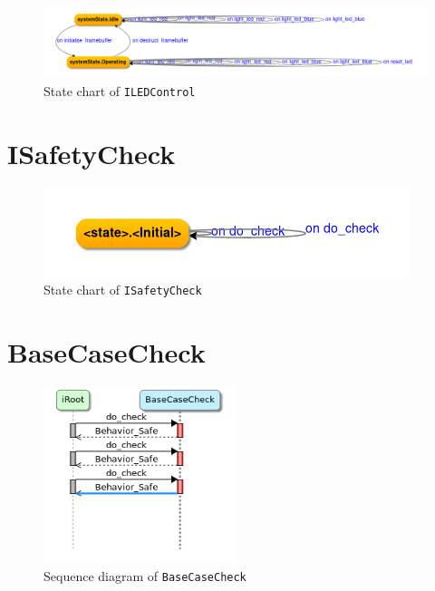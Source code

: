 \documentclass[12pt]{scrreprt}
\begin{document}
\begin{appendices}
\begin{figure}[H]
    \centering
    \includegraphics[width=\textwidth]{Figures/results/modelling_figures/ILEDControl/ILEDControlStateChart.png}
    \caption{State chart of \texttt{ILEDControl}}
    \label{fig:ILEDControl_state_chart}
\end{figure}

\section{ISafetyCheck}

\begin{figure}[H]
    \centering
    \includegraphics[width=\textwidth]{Figures/results/modelling_figures/ISafetyCheck/ISafetyCheck_state_chart.png}
    \caption{State chart of \texttt{ISafetyCheck}}
    \label{fig:ISafetyCheck_state_chart}
\end{figure}

\section{BaseCaseCheck}
\label{BaseCaseCheck_app}

\begin{figure}[H]
    \centering
    \includegraphics[width=0.5\textwidth]{Figures/results/modelling_figures/BaseCaseCheck/BaseCaseCheck_seq.png}
    \caption{Sequence diagram of \texttt{BaseCaseCheck}}
    \label{fig:BaseCaseCheck_seq}
\end{figure}


\end{appendices}
\end{document}
